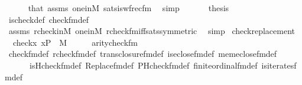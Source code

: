 \begin{isabellebody}
\ \ \ \ \isamarkupfalse%
\ that\ assms\ one{\isacharunderscore}{\kern0pt}in{\isacharunderscore}{\kern0pt}M\ sats{\isacharunderscore}{\kern0pt}is{\isacharunderscore}{\kern0pt}wfrec{\isacharunderscore}{\kern0pt}fm\ \isamarkupfalse%
\ simp\isanewline
\ \ \isamarkupfalse%
\isanewline
\ \ \isamarkupfalse%
\ {\isacharquery}{\kern0pt}thesis\ \isamarkupfalse%
\ is{\isacharunderscore}{\kern0pt}check{\isacharunderscore}{\kern0pt}def\ check{\isacharunderscore}{\kern0pt}fm{\isacharunderscore}{\kern0pt}def\isanewline
\ \ \ \ \isamarkupfalse%
\ assms\ rcheck{\isacharunderscore}{\kern0pt}in{\isacharunderscore}{\kern0pt}M\ one{\isacharunderscore}{\kern0pt}in{\isacharunderscore}{\kern0pt}M\ rcheck{\isacharunderscore}{\kern0pt}fm{\isacharunderscore}{\kern0pt}iff{\isacharunderscore}{\kern0pt}sats{\isacharbrackleft}{\kern0pt}symmetric{\isacharbrackright}{\kern0pt}\ \isamarkupfalse%
\ simp\isanewline
{}\isamarkupfalse%
%
\endisatagproof
{\isafoldproof}%
%
\isadelimproof
\isanewline
%
\endisadelimproof
\isanewline
\isanewline
{}\isamarkupfalse%
\ check{\isacharunderscore}{\kern0pt}replacement{\isacharcolon}{\kern0pt}\isanewline
\ \ {\isachardoublequoteopen}{\isacharbraceleft}{\kern0pt}check{\isacharparenleft}{\kern0pt}x{\isacharparenright}{\kern0pt}{\isachardot}{\kern0pt}\ x{\isasymin}P{\isacharbraceright}{\kern0pt}\ {\isasymin}\ M{\isachardoublequoteclose}\isanewline
%
\isadelimproof
%
\endisadelimproof
%
\isatagproof
{}\isamarkupfalse%
\ {\isacharminus}{\kern0pt}\isanewline
\ \ \isamarkupfalse%
\ {\isachardoublequoteopen}arity{\isacharparenleft}{\kern0pt}check{\isacharunderscore}{\kern0pt}fm{\isacharparenleft}{\kern0pt}{}{\isacharcomma}{\kern0pt}{}{\isacharcomma}{\kern0pt}{}{\isacharparenright}{\kern0pt}{\isacharparenright}{\kern0pt}\ {\isacharequal}{\kern0pt}\ {}{\isachardoublequoteclose}\isanewline
\ \ \ \ \isamarkupfalse%
\ check{\isacharunderscore}{\kern0pt}fm{\isacharunderscore}{\kern0pt}def\ rcheck{\isacharunderscore}{\kern0pt}fm{\isacharunderscore}{\kern0pt}def\ trans{\isacharunderscore}{\kern0pt}closure{\isacharunderscore}{\kern0pt}fm{\isacharunderscore}{\kern0pt}def\ is{\isacharunderscore}{\kern0pt}eclose{\isacharunderscore}{\kern0pt}fm{\isacharunderscore}{\kern0pt}def\ mem{\isacharunderscore}{\kern0pt}eclose{\isacharunderscore}{\kern0pt}fm{\isacharunderscore}{\kern0pt}def\isanewline
\ \ \ \ \ \ is{\isacharunderscore}{\kern0pt}Hcheck{\isacharunderscore}{\kern0pt}fm{\isacharunderscore}{\kern0pt}def\ Replace{\isacharunderscore}{\kern0pt}fm{\isacharunderscore}{\kern0pt}def\ PHcheck{\isacharunderscore}{\kern0pt}fm{\isacharunderscore}{\kern0pt}def\ finite{\isacharunderscore}{\kern0pt}ordinal{\isacharunderscore}{\kern0pt}fm{\isacharunderscore}{\kern0pt}def\ is{\isacharunderscore}{\kern0pt}iterates{\isacharunderscore}{\kern0pt}fm{\isacharunderscore}{\kern0pt}def\isanewline

\end{isabellebody}
